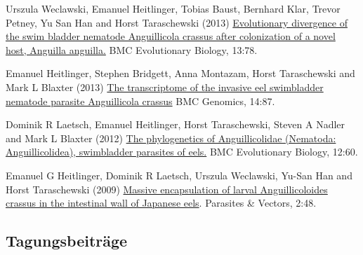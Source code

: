 \documentclass[10pt,a4paper]{article}
\renewenvironment{itemize}{
  \begin{list}{}{
    \setlength{\leftmargin}{2.5em}
    \setlength{\itemsep}{0.25em}
    \setlength{\parskip}{0pt}
    \setlength{\parsep}{0.25em}
  }
}{
  \end{list}
}
\begin{document}
\begin{itemize}

\item Urszula Weclawski, Emanuel Heitlinger, Tobias Baust,
  Bernhard Klar, Trevor Petney, Yu San Han and Horst Taraschewski
  (2013) 
  \href{http://www.biomedcentral.com/1471-2148/13/78}{
    Evolutionary divergence of the swim bladder nematode
    Anguillicola crassus after colonization of a novel host,
    Anguilla anguilla.} BMC Evolutionary Biology,
  13:78.

\item Emanuel Heitlinger, Stephen Bridgett, Anna Montazam,
  Horst Taraschewski and Mark L Blaxter (2013)
  \href{http://www.biomedcentral.com/1471-2164/14/87}{The
    transcriptome of the invasive eel swimbladder nematode parasite
    Anguillicola crassus} BMC Genomics, 
  14:87.

\item Dominik R Laetsch, Emanuel Heitlinger, Horst
  Taraschewski, Steven A Nadler and Mark L Blaxter (2012)
  \href{http://www.biomedcentral.com/1471-2148/12/60} {The
    phylogenetics of Anguillicolidae (Nematoda: Anguillicolidea),
    swimbladder parasites of eels.} BMC Evolutionary Biology,
  12:60.

\item Emanuel G Heitlinger, Dominik R Laetsch, Urszula
  Weclawski, Yu-San Han and Horst Taraschewski (2009)
  \href{http://www.parasitesandvectors.com/content/2/1/48}{Massive
    encapsulation of larval Anguillicoloides crassus in the
    intestinal wall of Japanese eels}. Parasites \& Vectors,
  2:48.
\end{itemize}

%



\subsection*{Tagungsbeitr\"age}
\end{document}
